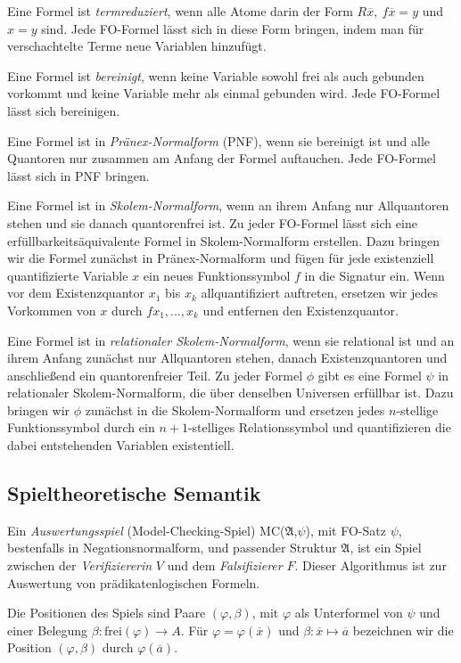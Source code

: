 \documentclass{panikzettel}
\newcommand{\A}{\mathfrak{A}}
\begin{document}
Eine Formel ist \emph{termreduziert}, wenn alle Atome darin der Form $R \overline{x},\ f \overline{x} = y$ und $x = y$ sind. Jede FO-Formel lässt sich in diese Form bringen, indem man für verschachtelte Terme neue Variablen hinzufügt.

Eine Formel ist \emph{bereinigt}, wenn keine Variable sowohl frei als auch gebunden vorkommt und keine Variable mehr als einmal gebunden wird. Jede FO-Formel lässt sich bereinigen.

Eine Formel ist in \emph{Pränex-Normalform} (PNF), wenn sie bereinigt ist und alle Quantoren nur zusammen am Anfang der Formel auftauchen. Jede FO-Formel lässt sich in PNF bringen.

Eine Formel ist in \emph{Skolem-Normalform}, wenn an ihrem Anfang nur Allquantoren stehen und sie danach quantorenfrei ist. Zu jeder FO-Formel lässt sich eine erfüllbarkeitsäquivalente Formel in Skolem-Normalform erstellen. Dazu bringen wir die Formel zunächst in Pränex-Normalform und fügen für jede existenziell quantifizierte Variable $x$ ein neues Funktionssymbol $f$ in die Signatur ein. Wenn vor dem Existenzquantor $x_1$ bis $x_k$ allquantifiziert auftreten, ersetzen wir jedes Vorkommen von $x$ durch $f x_1,\dots,x_k$ und entfernen den Existenzquantor.

Eine Formel ist in \emph{relationaler Skolem-Normalform}, wenn sie relational ist und an ihrem Anfang zunächst nur Allquantoren stehen, danach Existenzquantoren und anschließend ein quantorenfreier Teil. Zu jeder Formel $\phi$ gibt es eine Formel $\psi$ in relationaler Skolem-Normalform, die über denselben Universen erfüllbar ist. Dazu bringen wir $\phi$ zunächst in die Skolem-Normalform und ersetzen jedes $n$-stellige Funktionssymbol durch ein $n+1$-stelliges Relationssymbol und quantifizieren die dabei entstehenden Variablen existentiell.

\subsection{Spieltheoretische Semantik}
Ein \emph{Auswertungsspiel} (Model-Checking-Spiel) MC($\A$,$\psi$), mit FO-Satz $\psi$, bestenfalls in Negationsnormalform, und passender Struktur $\A$, ist ein Spiel zwischen der \emph{Verifiziererin} $V$ und dem \emph{Falsifizierer} $F$. Dieser Algorithmus ist zur Auswertung von prädikatenlogischen Formeln.

Die Positionen des Spiels sind Paare $(\varphi,\beta)$, mit $\varphi$ als Unterformel von $\psi$ und einer Belegung $\beta:\mathrm{frei}(\varphi)\to A$. Für $\varphi=\varphi(\overline{x})$ und $\beta:\overline{x}\mapsto\overline{a}$ bezeichnen wir die Position $(\varphi,\beta)$ durch $\varphi(\overline{a})$.
\end{document}
